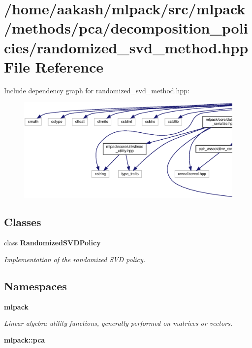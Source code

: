 \section{/home/aakash/mlpack/src/mlpack/methods/pca/decomposition\+\_\+policies/randomized\+\_\+svd\+\_\+method.hpp File Reference}
\label{pca_2decomposition__policies_2randomized__svd__method_8hpp}
Include dependency graph for randomized\+\_\+svd\+\_\+method.\+hpp\+:
\nopagebreak
\begin{figure}[H]
\begin{center}
\leavevmode
\includegraphics[width=350pt]{pca_2decomposition__policies_2randomized__svd__method_8hpp__incl}
\end{center}
\end{figure}
\subsection*{Classes}
\begin{DoxyCompactItemize}
\item 
class \textbf{ Randomized\+S\+V\+D\+Policy}
\begin{DoxyCompactList}\small\item\em Implementation of the randomized S\+VD policy. \end{DoxyCompactList}\end{DoxyCompactItemize}
\subsection*{Namespaces}
\begin{DoxyCompactItemize}
\item 
 \textbf{ mlpack}
\begin{DoxyCompactList}\small\item\em Linear algebra utility functions, generally performed on matrices or vectors. \end{DoxyCompactList}\item 
 \textbf{ mlpack\+::pca}
\end{DoxyCompactItemize}


